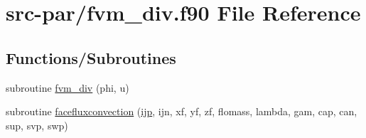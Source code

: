 \hypertarget{fvm__div_8f90}{\section{src-\/par/fvm\-\_\-div.f90 File Reference}
\label{fvm__div_8f90}
}
\subsection*{Functions/\-Subroutines}
\begin{DoxyCompactItemize}
\item 
subroutine \hyperlink{fvm__div_8f90_a3bf5e342cbad8f8f59606aabf67f93c8}{fvm\-\_\-div} (phi, u)
\item 
subroutine \hyperlink{fvm__div_8f90_ad05db880196924d86a45e79172daed58}{facefluxconvection} (\hyperlink{CourantNo_8h_accea320a458bb8759c7ece360e05ddf4}{ijp}, ijn, xf, yf, zf, flomass, lambda, gam, cap, can, sup, svp, swp)
\end{DoxyCompactItemize}



